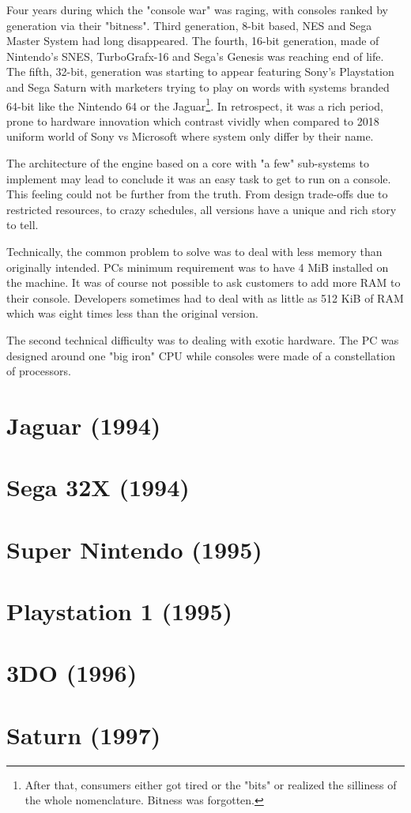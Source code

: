 Four years during which the "console war" was raging, with consoles ranked by generation via their "bitness". Third generation, 8-bit based, NES and Sega Master System had long disappeared. The fourth, 16-bit generation, made of Nintendo's SNES, TurboGrafx-16 and Sega's Genesis was reaching end of life. The fifth, 32-bit, generation 
was starting to appear featuring Sony's Playstation and Sega Saturn with marketers trying to play on words with systems branded 64-bit like the Nintendo 64 or the Jaguar\footnote{After that, consumers either got tired or the "bits" or realized the silliness of the whole nomenclature. Bitness was forgotten.}. In retrospect, it was a rich period, prone to hardware innovation which contrast vividly when compared to 2018 uniform world of Sony vs Microsoft where system only differ by their name.\\
\par
The architecture of the engine based on a core with "a few" sub-systems to implement may lead to conclude it was an easy task to get \doom{} to run on a console. This feeling could not be further from the truth. From design trade-offs due to restricted resources, to crazy schedules, all versions have a unique and rich story to tell.\\
\par
Technically, the common problem to solve was to deal with less memory than originally intended. PCs minimum requirement was to have 4 MiB installed on the machine. It was of course not possible to ask customers to add more RAM to their console. Developers sometimes had to deal with as little as 512 KiB of RAM which was eight times less than the original version.\\
\par
The second technical difficulty was to dealing with exotic hardware. The PC was designed around one "big iron" CPU while consoles were made of a constellation of processors.


\section{Jaguar (1994)}
 

\section{Sega 32X (1994)}
 

\section{Super Nintendo (1995)}


\section{Playstation 1 (1995)}


\section{3DO (1996)}


\section{Saturn (1997)}


